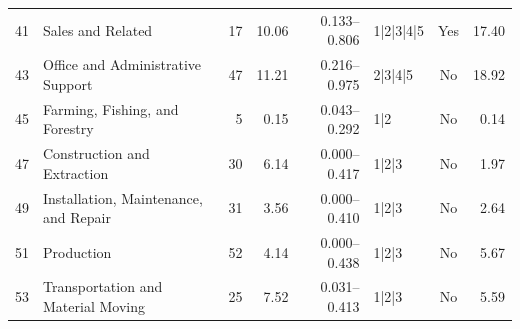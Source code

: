 \begin{center}
\begin{longtable}{@{}r p{} r r r l c r@{}}
41 & Sales and Related & 17 & 10.06 & 0.133--0.806 & 1|2|3|4|5 & Yes & 17.40 \\
43 & Office and Administrative Support & 47 & 11.21 & 0.216--0.975 & 2|3|4|5 & No & 18.92 \\
45 & Farming, Fishing, and Forestry & 5 & 0.15 & 0.043--0.292 & 1|2 & No & 0.14 \\
47 & Construction and Extraction & 30 & 6.14 & 0.000--0.417 & 1|2|3 & No & 1.97 \\
49 & Installation, Maintenance, and Repair & 31 & 3.56 & 0.000--0.410 & 1|2|3 & No & 2.64 \\
51 & Production & 52 & 4.14 & 0.000--0.438 & 1|2|3 & No & 5.67 \\
53 & Transportation and Material Moving & 25 & 7.52 & 0.031--0.413 & 1|2|3 & No & 5.59 \\
\end{longtable}
\end{center}
